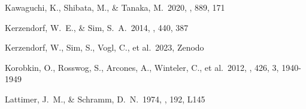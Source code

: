 \documentclass[twocolumn,twocolappendix]{aastex63}
\begin{document}
{\begin{thebibliography}{}
 Kawaguchi, K., Shibata, M., \& Tanaka, M.\ 2020, \apj, 889, 171


 Kerzendorf, W.~E., \& Sim, S.~A.\ 2014, \mnras, 440, 387


 Kerzendorf, W., Sim, S., Vogl, C., et al.\ 2023, Zenodo





 Korobkin, O., Rosswog, S., Arcones, A., Winteler, C., et al.\ 2012, \mnras, 426, 3, 1940-1949



















 Lattimer, J.~M., \& Schramm, D.~N.\ 1974, \apjl, 192, L145



\end{thebibliography}}
\end{document}
